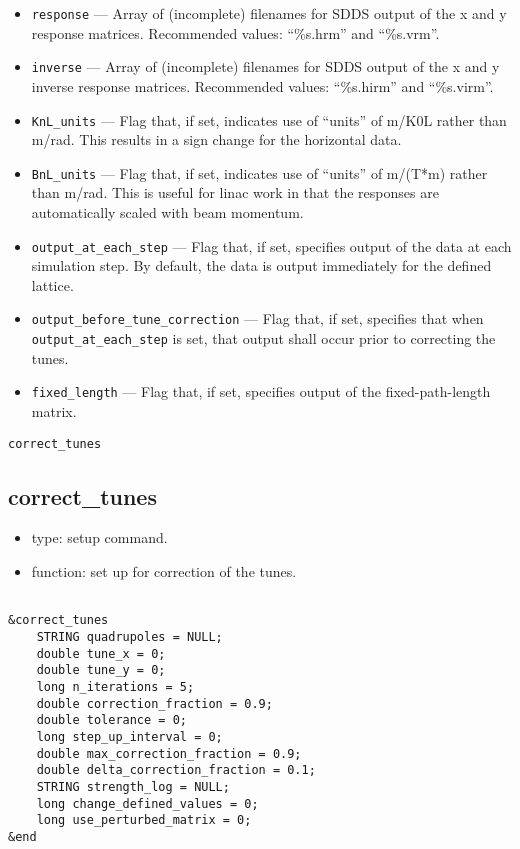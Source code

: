 \documentclass[11pt]{article}
\begin{document}
\begin{itemize}
\item \verb|response| --- Array of (incomplete) filenames for SDDS output of the x and y response
matrices.  Recommended values: ``\%s.hrm'' and ``\%s.vrm''.
\item \verb|inverse| --- Array of (incomplete) filenames for SDDS output of the x and y 
inverse response matrices. Recommended values: ``\%s.hirm'' and ``\%s.virm''.
\item \verb|KnL_units| --- Flag that, if set, indicates use of ``units'' of m/K0L rather than
m/rad.  This results in a sign change for the horizontal data.
\item \verb|BnL_units| --- Flag that, if set, indicates use of ``units'' of m/(T*m) rather than
m/rad.  This is useful for linac work in that the responses are automatically scaled with 
beam momentum.
\item \verb|output_at_each_step| --- Flag that, if set, specifies output of the data at
each simulation step.  By default, the data is output immediately for the defined lattice.
\item \verb|output_before_tune_correction| --- Flag that, if set, specifies that when 
\verb|output_at_each_step| is set, that output shall occur prior to correcting the tunes.
\item \verb|fixed_length| --- Flag that, if set, specifies output of the fixed-path-length
matrix.
\end{itemize}

\begin{latexonly}
\newpage
\begin{center}{\Large\verb|correct_tunes|}\end{center}
\end{latexonly}
\subsection{correct\_tunes \label{subsec:correcttunes}}

\begin{itemize}
\item type: setup command.
\item function: set up for correction of the tunes.
\end{itemize}

\begin{verbatim}

&correct_tunes
    STRING quadrupoles = NULL;
    double tune_x = 0;
    double tune_y = 0;
    long n_iterations = 5;
    double correction_fraction = 0.9;
    double tolerance = 0;
    long step_up_interval = 0;
    double max_correction_fraction = 0.9;
    double delta_correction_fraction = 0.1;
    STRING strength_log = NULL;
    long change_defined_values = 0;
    long use_perturbed_matrix = 0;
&end
\end{verbatim}
\end{document}
